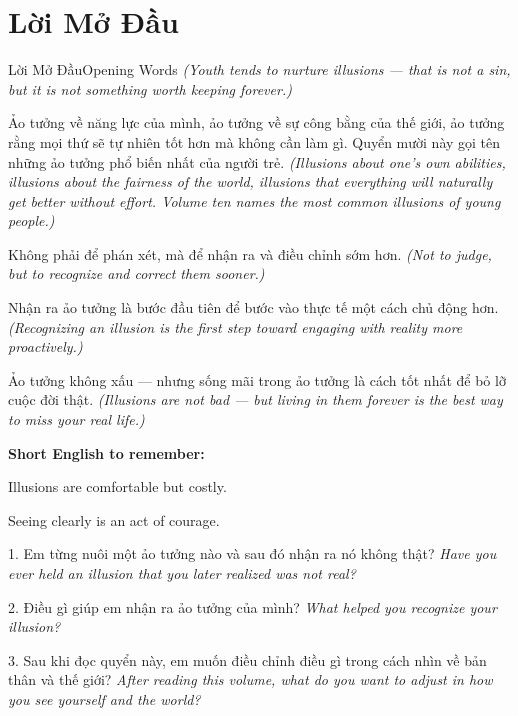 \chapter*{Lời Mở Đầu}

\begin{truyen}{Lời Mở Đầu}{Opening Words}
\textit{(Youth tends to nurture illusions --- that is not a sin, but it is not something worth keeping forever.)}

Ảo tưởng về năng lực của mình, ảo tưởng về sự công bằng của thế giới, ảo tưởng rằng mọi thứ sẽ tự nhiên tốt hơn mà không cần làm gì. Quyển mười này gọi tên những ảo tưởng phổ biến nhất của người trẻ.
\textit{(Illusions about one's own abilities, illusions about the fairness of the world, illusions that everything will naturally get better without effort. Volume ten names the most common illusions of young people.)}

Không phải để phán xét, mà để nhận ra và điều chỉnh sớm hơn.
\textit{(Not to judge, but to recognize and correct them sooner.)}

Nhận ra ảo tưởng là bước đầu tiên để bước vào thực tế một cách chủ động hơn.
\textit{(Recognizing an illusion is the first step toward engaging with reality more proactively.)}
\end{truyen}

\begin{baihoc}
Ảo tưởng không xấu --- nhưng sống mãi trong ảo tưởng là cách tốt nhất để bỏ lỡ cuộc đời thật.
\textit{(Illusions are not bad --- but living in them forever is the best way to miss your real life.)}
\end{baihoc}

\begin{ghinhoanh}
\textbf{Short English to remember:}

Illusions are comfortable but costly.

Seeing clearly is an act of courage.
\end{ghinhoanh}

\begin{tuhocnhanh}
1. Em từng nuôi một ảo tưởng nào và sau đó nhận ra nó không thật? \textit{Have you ever held an illusion that you later realized was not real?}

2. Điều gì giúp em nhận ra ảo tưởng của mình? \textit{What helped you recognize your illusion?}

3. Sau khi đọc quyển này, em muốn điều chỉnh điều gì trong cách nhìn về bản thân và thế giới? \textit{After reading this volume, what do you want to adjust in how you see yourself and the world?}
\end{tuhocnhanh}

\ngancach
